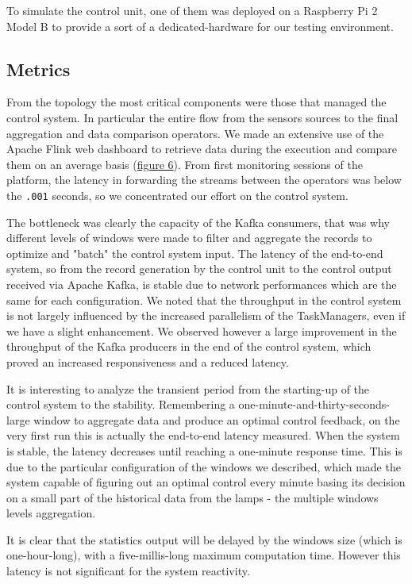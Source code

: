 To simulate the control unit, one of them was deployed on a Raspberry Pi 2 Model B to provide a sort of a dedicated-hardware for our testing environment.

\subsection{Metrics}
From the topology the most critical components were those that managed the control system. In particular the entire flow from the sensors sources to the final aggregation and data comparison operators. We made an extensive use of the Apache Flink web dashboard to retrieve data during the execution and compare them on an average basis (\hyperref[fig:ember_metrics]{figure 6}). From first monitoring sessions of the platform, the latency in forwarding the streams between the operators was below the \texttt{.001} seconds, so we concentrated our effort on the control system. 

The bottleneck was clearly the capacity of the Kafka consumers, that was why different levels of windows were made to filter and aggregate the records to optimize and "batch" the control system input. The latency of the end-to-end system, so from the record generation by the control unit to the control output received via Apache Kafka, is stable due to network performances which are the same for each configuration. We noted that the throughput in the control system is not largely influenced by the increased parallelism of the TaskManagers, even if we have a slight enhancement. We observed however a large improvement in the throughput of the Kafka producers in the end of the control system, which proved an increased responsiveness and a reduced latency. 

It is interesting to analyze the transient period from the starting-up of the control system to the stability. Remembering a one-minute-and-thirty-seconds-large window to aggregate data and produce an optimal control feedback, on the very first run this is actually the end-to-end latency measured. When the system is stable, the latency decreases until reaching a one-minute response time. This is due to the particular configuration of the windows we described, which made the system capable of figuring out an optimal control every minute basing its decision on a small part of the historical data from the lamps - the multiple windows levels aggregation.

It is clear that the statistics output will be delayed by the windows size (which is one-hour-long), with a five-millis-long maximum computation time. However this latency is not significant for the system reactivity.

